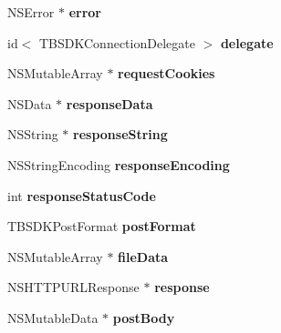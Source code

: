 \begin{DoxyCompactItemize}
N\+S\+Error $\ast$ {\bfseries error}
\item 
\mbox{\label{interface_t_b_s_d_k_connection_a32d11ae83e821704a284fcf4c0494638}} 
id$<$ T\+B\+S\+D\+K\+Connection\+Delegate $>$ {\bfseries delegate}
\item 
\mbox{\label{interface_t_b_s_d_k_connection_ae093d20f7a142e6cfe0bbf51e077ab11}} 
N\+S\+Mutable\+Array $\ast$ {\bfseries request\+Cookies}
\item 
\mbox{\label{interface_t_b_s_d_k_connection_a40e68a96c7539f0fa178532a0640077e}} 
N\+S\+Data $\ast$ {\bfseries response\+Data}
\item 
\mbox{\label{interface_t_b_s_d_k_connection_aeffeeb506fcd81efd8f66cfdb2fc1de1}} 
N\+S\+String $\ast$ {\bfseries response\+String}
\item 
\mbox{\label{interface_t_b_s_d_k_connection_a5290cd19d44632887f9e6276eec408b0}} 
N\+S\+String\+Encoding {\bfseries response\+Encoding}
\item 
\mbox{\label{interface_t_b_s_d_k_connection_ab51215c5d27295d43640ca3b1deabaeb}} 
int {\bfseries response\+Status\+Code}
\item 
\mbox{\label{interface_t_b_s_d_k_connection_abdc5bc7cccfd644a1ae6333181f9766b}} 
T\+B\+S\+D\+K\+Post\+Format {\bfseries post\+Format}
\item 
\mbox{\label{interface_t_b_s_d_k_connection_acf06d49938b9bf480577b4dc5e97f1f9}} 
N\+S\+Mutable\+Array $\ast$ {\bfseries file\+Data}
\item 
\mbox{\label{interface_t_b_s_d_k_connection_a72f512ea4da63f3d122cd5492d41dcd7}} 
N\+S\+H\+T\+T\+P\+U\+R\+L\+Response $\ast$ {\bfseries response}
\item 
\mbox{\label{interface_t_b_s_d_k_connection_a4d08d3d17940b098504fbf3ebf43f9ca}} 
N\+S\+Mutable\+Data $\ast$ {\bfseries post\+Body}

\end{DoxyCompactItemize}
